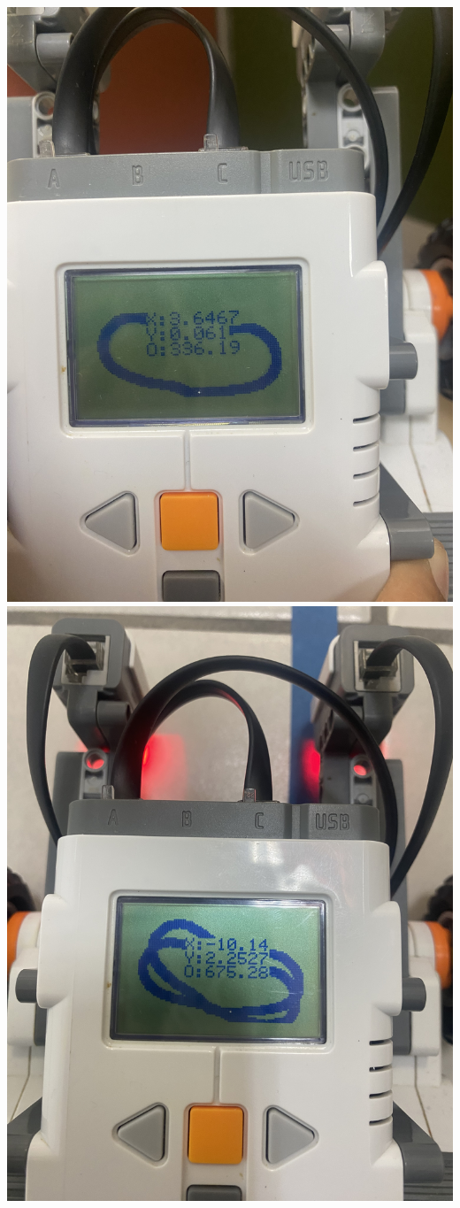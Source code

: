 \documentclass[oneside,onecolumn]{article}
\begin{document}
\includegraphics[scale=0.09]{graficos/corrida1.png}
\includegraphics[scale=0.09]{graficos/corrida2.png}
\end{document}

